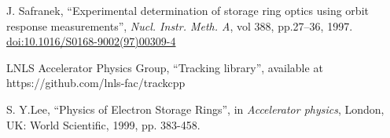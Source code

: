 \documentclass[a4paper,
               keeplastbox,   %
               ]{jacow}
\begin{document}
\begin{thebibliography}{14}
	 J. Safranek,
		\textquotedblleft{Experimental determination of storage ring optics using orbit response measurements}\textquotedblright,
		\emph{Nucl.  Instr. Meth. A}, vol 388, pp.27--36, 1997.
        \url{doi:10.1016/S0168-9002(97)00309-4}

        LNLS Accelerator Physics Group,
        \textquotedblleft{Tracking library}\textquotedblright,
        available at https://github.com/lnls-fac/trackcpp
        


        S. Y.Lee,
        \textquotedblleft{Physics of Electron Storage Rings}\textquotedblright,
        in \emph{Accelerator physics}, London, UK: World Scientific, 1999, pp. 383-458.

 






        
 
       

 

\end{thebibliography}
\end{document}
